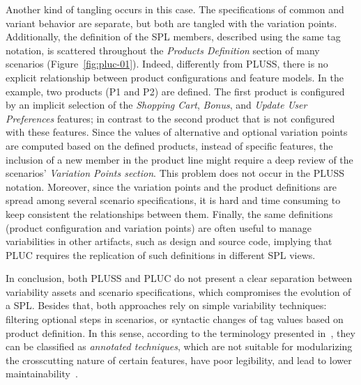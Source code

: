 \documentclass{sig-alt-full}
\begin{document}
Another kind of tangling occurs in this case. The specifications of common and
variant behavior are separate, but both are tangled with the variation points.
Additionally, the definition of the SPL members, described using the
same tag notation, is scattered throughout the \emph{Products
Definition} section of many scenarios (Figure~\ref{fig:pluc-01}).
Indeed, differently from PLUSS, there is no explicit
relationship between product configurations and feature models. In the example, two products (P1 and P2) are defined. The first product is configured by an implicit selection of the \emph{Shopping Cart}, \emph{Bonus}, and \emph{Update
User Preferences} features; in contrast to the second product that is not
configured with these features. Since the values of alternative and optional
variation points are computed based on the defined products, instead of specific
features, the inclusion of a new member in the product line might require a deep
review of the scenarios' \emph{Variation Points section}. This problem does not 
occur in the PLUSS notation. Moreover, since the
variation points and the product definitions are spread among several scenario
specifications, it is hard and time consuming to keep consistent the
relationships between them. Finally, the same definitions (product configuration
and variation points) are often useful to manage variabilities in other
artifacts, such as design and source code, implying that PLUC
requires the replication of such definitions in different SPL views.

In conclusion, both PLUSS and PLUC do not present a clear separation between
variability assets and scenario specifications, which compromises the
evolution of a SPL. Besides that, both approaches rely on simple
variability techniques: filtering optional steps in scenarios, or syntactic
changes of tag values based on product definition. In this sense, according to the terminology
presented in~\cite{Kastner:2008aa}, they can be classified as \emph{annotated
techniques}, which are not suitable for modularizing the crosscutting nature of certain
features, have poor legibility, and lead to lower
maintainability~\cite{Alves:2006aa,Kastner:2008aa}.

\end{document}
